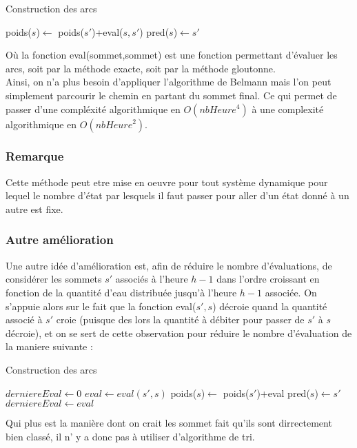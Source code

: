 \documentclass[a4paper]{report}
\begin{document}
 \begin{algorithm}[H]
 \caption{Construction des arcs}
 
 
 \begin{algorithmic}


 \STATE poids($s$)$\longleftarrow$ poids($s'$)+eval($s,s'$)
\STATE pred($s$)$\longleftarrow s'$
 \ENDIF

 \ENDFOR
 

 \end{algorithmic}
 \end{algorithm}
Où la fonction eval(sommet,sommet) est une fonction permettant d'évaluer les arcs, soit par la méthode exacte, soit par la méthode gloutonne.\\

Ainsi, on n'a plus besoin d'appliquer l'algorithme de Belmann mais l'on peut simplement parcourir le chemin en partant du sommet final. Ce qui permet de passer d'une compléxité algorithmique en $O(nbHeure^4)$ à une complexité algorithmique en $O(nbHeure^2)$.
\subsubsection*{Remarque}
Cette méthode peut etre mise en oeuvre pour tout système dynamique pour lequel le nombre d'état par lesquels il faut passer pour aller d'un état donné à un autre est fixe.
\subsubsection*{Autre amélioration } Une autre idée d'amélioration est, afin de réduire le nombre d'évaluations, de considérer les sommets $s'$ associés à l'heure $h-1$ dans l'ordre croissant en fonction de la quantité d'eau distribuée jusqu'à l'heure $h-1$ associée. On s'appuie alors sur le fait que la fonction eval($s',s$) décroie quand la quantité associé à $s'$ croie (puisque des lors la quantité à débiter pour passer de $s'$ à $s$ décroie), et on se sert de cette observation pour réduire le nombre d'évaluation de la maniere suivante :\\
 \begin{algorithm}[H]
 \caption{Construction des arcs}
 
 
 \begin{algorithmic}

\STATE $derniereEval \longleftarrow 0$
\STATE $eval\longleftarrow eval(s',s)$
 \STATE poids($s$)$\longleftarrow$ poids($s'$)+eval
\STATE pred($s$)$\longleftarrow s'$
\STATE $derniereEval\longleftarrow eval$
 \ENDIF
\ENDIF

 \ENDFOR

 

 \end{algorithmic}
 \end{algorithm}
Qui plus est la manière dont on crait les sommet fait qu'ils sont dirrectement bien classé, il n' y a donc pas à utiliser d'algorithme de tri.\\
\end{document}
